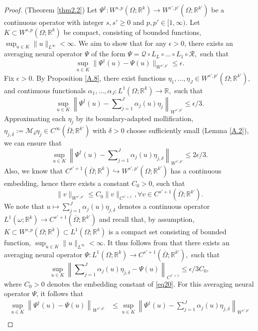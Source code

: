 \documentclass[reqno,9pt]{amsart}
\theoremstyle{plain}
\theoremstyle{definition}
\newcommand{\bb}[1]{\mathbb{#1}}
\newcommand{\cal}[1]{\mathcal{#1}}
\begin{document}
\begin{proof}(Theorem \ref{thm2.2})
    Let $\Psi^\dag : W^{s,p}(\Omega;\bb R^k) \to W^{s',p'}(\Omega;\bb R^{k'})$ be a continuous operator with integer $s,s' \geq 0$ and $p, p' \in [1,\infty)$. Let $K \subset W^{s,p}(\Omega;\bb R^k)$ be compact, consisting of bounded functions, $\sup_{u\in K}\|u\|_{L^\infty} < \infty.$ We aim to show that for any $\epsilon> 0$, there exists an averaging neural operator $\Psi$ of the form $\Psi = \cal Q \circ L_L \circ \dots \circ L_1 \circ\cal R,$ such that 
    $$ \sup_{u\in K}\|\Psi^\dag(u) - \Psi(u)\|_{W^{s',p'}} \leq \epsilon.$$
    Fix $\epsilon > 0$. By Proposition \ref{A.8}, there exist functions $\eta_1, \dots, \eta_J \in W^{s',p'}(\Omega;\bb R^{k'}),$ and continuous functionals $\alpha_1, \dots, \alpha_J : L^1(\Omega;\bb R^k) \to \bb R,$ such that
    $$ \sup_{u\in K}\left\|\Psi^\dag(u) - \sum\nolimits_{j=1}^{J}\alpha_j(u)\eta_j\right\|_{W^{s',p'}} \leq \epsilon/3.$$
    Approximating each $\eta_j$ by its boundary-adapted mollification, $\eta_{j,\delta} := \cal M_{\delta}\eta_j \in C^\infty(\overline{\Omega};\bb R^{k'})$ with $\delta > 0$ choose sufficiently small (Lemma \ref{A.2}), we can ensure that
    $$\sup_{u\in K}\left\|\Psi^\dag(u) - \sum\nolimits_{j=1}^{J}\alpha_j(u)\eta_{j,\delta}\right\|_{W^{s',p'}} \leq 2\epsilon/3.$$
    Also, we know that $C^{s'+1}(\overline{\Omega};\bb R^k) \hookrightarrow W^{s',p'}(\Omega;\bb R^{k'})$ has a continuous embedding, hence there exists a constant $C_0 > 0$, such that
    \begin{equation}
        \|v\|_{W^{s',p'}} \leq C_0\|v\|_{C^{s'+1}}, \forall v\in C^{s'+1}(\overline{\Omega};\bb R^{k'}).
\end{equation}
We note that $u \mapsto \sum_{j=1}^{J}\alpha_j(u)\eta_{j,\delta}$ denotes a continuous operator $L^1(\omega;\bb R^k) \to C^{s'+1}(\overline{\Omega};\bb R^{k'})$ and recall that, by assumption, $K \subset W^{s,p}(\Omega;\bb R^k) \subset L^1(\Omega;\bb R^k)$ is a compact set consisting of bounded function, $\sup_{u\in K}\|u\|_{L^\infty} < \infty$. It thus follows from  that there exists an averaging neural operator $\Psi:L^1(\Omega;\bb R^k) \to C^{s'+1}(\overline{\Omega};\bb R^{k'}),$ such that 
$$ \sup_{u\in K}\left\|\sum\nolimits_{j=1}^{J}\alpha_j(u)\eta_{j,\delta} - \Psi(u)\right\|_{C^{s'+1}} \leq \epsilon/3C_0,$$
where $C_0 > 0$ denotes the embedding constant of \ref{eq20}. For this averaging neural operator $\Psi$, it follows that 
$$ 
\begin{aligned}
    \sup_{u\in K}\left\|\Psi^\dag(u) - \Psi(u)\right\|_{W^{s',p'}} &\leq \sup_{u\in K}\left\|\Psi^\dag (u) - \sum\nolimits_{j=1}^{J} \alpha_j(u) \eta_{j,\delta}\right\|_{W^{s',p'}}\\

\end{aligned}$$
\end{proof}
\end{document}
